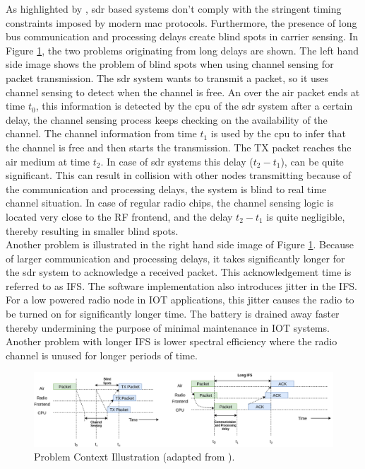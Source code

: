As highlighted by \cite{schmid_experimental_2007}, \ac{sdr} based systems don't comply with the stringent timing constraints imposed by modern \ac{mac} protocols. Furthermore, the presence of long bus communication and processing delays create blind spots \cite{schmid_experimental_2007} in carrier sensing. 
In Figure \ref{blind_spots}, the two problems originating from long delays are shown.
The left hand side image shows the problem of blind spots when using channel sensing for packet transmission.
The \ac{sdr} system wants to transmit a packet, so it uses channel sensing to detect when the channel is free.
An over the air packet ends at time $t_0$, this information is detected by the \ac{cpu} of the \ac{sdr} system after a certain delay, the channel sensing process keeps checking on the availability of the channel.
The channel information from time $t_1$ is used by the \ac{cpu} to infer that the channel is free and then starts the transmission.
The TX packet reaches the air medium at time $t_2$.
In case of \ac{sdr} systems this delay ($t_2-t_1$), can be quite significant.
This can result in collision with other nodes transmitting because of the communication and processing delays, the system is blind to real time channel situation.
In case of regular radio chips, the channel sensing logic is located very close to the \ac{RF} frontend, and the delay $t_2 - t_1$ is quite negligible, thereby resulting in smaller blind spots.\\

Another problem is illustrated in the right hand side image of Figure \ref{blind_spots}.
Because of larger communication and processing delays, it takes significantly longer for the \ac{sdr} system to acknowledge a received packet.
This acknowledgement time is referred to as \ac{IFS}.
The software implementation also introduces jitter in the {IFS}.
For a low powered radio node in \ac{IOT} applications, this jitter causes the radio to be turned on for significantly longer time.
The battery is drained away faster thereby undermining the purpose of minimal maintenance in \ac{IOT} systems.
Another problem with longer \ac{IFS} is lower spectral efficiency where the radio channel is unused for longer periods of time.\\ 

\begin{figure}[!h]
\centering
\includegraphics[width=\textwidth]{Figure/BlindSpots.png}
\caption{Problem Context Illustration (adapted from \cite{schmid_experimental_2007}).}
\label{blind_spots}
\end{figure}

